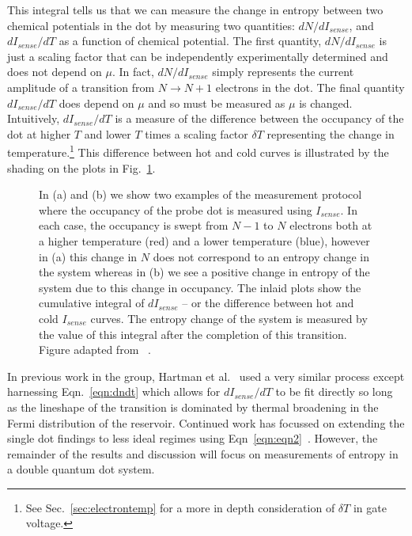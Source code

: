 This integral tells us that we can measure the change in entropy between two chemical potentials in the dot by measuring two quantities: $dN/dI_{sense}$, and $dI_{sense}/dT$ as a function of chemical potential. The first quantity, $dN/dI_{sense}$ is just a scaling factor that can be independently experimentally determined and does not depend on $\mu$. In fact, $dN/dI_{sense}$ simply represents the current amplitude of a transition from $N \to N+1$ electrons in the dot. The final quantity $dI_{sense}/dT$ does depend on $\mu$ and so must be measured as $\mu$ is changed. Intuitively, $dI_{sense}/dT$ is a measure of the difference between the occupancy of the dot at higher $T$ and lower $T$ times a scaling factor $\delta T$ representing the change in temperature.\footnote{See Sec.~\ref{sec:electrontemp} for a more in depth consideration of $\delta T$ in gate voltage.} This difference between hot and cold curves is illustrated by the shading on the plots in Fig.~\ref{fig:num_int}. 
\begin{figure}[h]
\centering
{}
\caption{In (a) and (b) we show two examples of the measurement protocol where the occupancy of the probe dot is measured using $I_{sense}$. In each case, the occupancy is swept from $N - 1$ to $N$ electrons both at a higher temperature (red) and a lower temperature (blue), however in (a) this change in $N$ does not correspond to an entropy change in the system whereas in (b) we see a positive change in entropy of the system due to this change in occupancy. The inlaid plots show the cumulative integral of $d I_{sense}$ -- or the difference between hot and cold $I_{sense}$ curves. The entropy change of the system is measured by the value of this integral after the completion of this transition. Figure adapted from ~\cite{nikentropy}.}
\label{fig:num_int}       %
\end{figure}

In previous work in the group, Hartman et al.~\cite{nikentropy} used a very similar process except harnessing Eqn.~\ref{eqn:dndt} which allows for $dI_{sense}/dT$ to be fit directly so long as the lineshape of the transition is dominated by thermal broadening in the Fermi distribution of the reservoir. Continued work has focussed on extending the single dot findings to less ideal regimes using Eqn~\ref{eqn:eqn2}~\cite{child2020entropy}. However, the remainder of the results and discussion will focus on measurements of entropy in a double quantum dot system.

